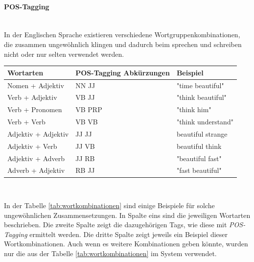 \paragraph{POS-Tagging}\mbox{}\\
In der Englischen Sprache existieren verschiedene Wortgruppenkombinationen, die zusammen ungewöhnlich klingen und dadurch beim sprechen und schreiben nicht oder nur selten verwendet werden.
\begin{center}
	\begin{tabularx}{1\textwidth} { 
			| >{\raggedright\arraybackslash}X 
			| >{\raggedright\arraybackslash}X
			| >{\raggedright\arraybackslash}X | }
		\hline
		Wortarten & POS-Tagging Abkürzungen & Beispiel \\
		\hline
		\hline
		Nomen + Adjektiv & NN JJ & "time beautiful"\\
		\hline
		Verb + Adjektiv & VB JJ & "think beautiful"\\
		\hline
		Verb + Pronomen & VB PRP & "think him"\\
		\hline
		Verb + Verb & VB VB & "think understand"\\
		\hline
		Adjektiv + Adjektiv & JJ JJ & beautiful strange\\
		\hline
		Adjektiv + Verb & JJ VB & beautiful think\\
		\hline
		Adjektiv + Adverb & JJ RB & "beautiful fast"\\
		\hline
		Adverb + Adjektiv & RB JJ & "fast beautiful"\\
		\hline
	\end{tabularx}\\
	\label{tab:wortkombinationen}
\end{center}
In der Tabelle \ref{tab:wortkombinationen} sind einige Beispiele für solche ungewöhnlichen Zusammensetzungen. In Spalte eins sind die jeweiligen Wortarten beschrieben. Die zweite Spalte zeigt die dazugehörigen Tags, wie diese mit \emph{POS-Tagging} ermittelt werden. Die dritte Spalte zeigt jeweils ein Beispiel dieser Wortkombinationen. Auch wenn es weitere Kombinationen geben könnte, wurden nur die aus der Tabelle \ref{tab:wortkombinationen} im System verwendet.\\

